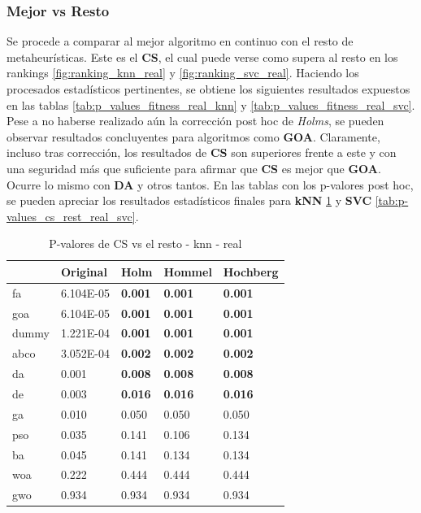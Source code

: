 \subsubsection{Mejor vs Resto}
Se procede a comparar al mejor algoritmo en continuo con el resto de metaheurísticas. Este es el \textbf{CS}, el cual puede verse como supera al resto en los rankings \ref{fig:ranking_knn_real} y \ref{fig:ranking_svc_real}. Haciendo los procesados estadísticos pertinentes, se obtiene los siguientes resultados expuestos en las tablas \ref{tab:p_values_fitness_real_knn} y \ref{tab:p_values_fitness_real_svc}.\\[6pt]
Pese a no haberse realizado aún la corrección post hoc de \textit{Holms}, se pueden observar resultados concluyentes para algoritmos como \textbf{GOA}. Claramente, incluso tras corrección, los resultados de \textbf{CS} son superiores frente a este y con una seguridad más que suficiente para afirmar que \textbf{CS} es mejor que \textbf{GOA}. Ocurre lo mismo con \textbf{DA} y otros tantos. En las tablas con los p-valores post hoc, se pueden apreciar los resultados estadísticos finales para \textbf{kNN} \ref{tab:p-values_cs_rest_real_knn} y \textbf{SVC} \ref{tab:p-values_cs_rest_real_svc}.

\begin{table}
    \centering
    \begin{tabular}{lllll}
        \toprule
        {}    & Original  & Holm           & Hommel         & Hochberg       \\
        \midrule
        fa    & 6.104E-05 & \textbf{0.001} & \textbf{0.001} & \textbf{0.001} \\
        goa   & 6.104E-05 & \textbf{0.001} & \textbf{0.001} & \textbf{0.001} \\
        dummy & 1.221E-04 & \textbf{0.001} & \textbf{0.001} & \textbf{0.001} \\
        abco  & 3.052E-04 & \textbf{0.002} & \textbf{0.002} & \textbf{0.002} \\
        da    & 0.001     & \textbf{0.008} & \textbf{0.008} & \textbf{0.008} \\
        de    & 0.003     & \textbf{0.016} & \textbf{0.016} & \textbf{0.016} \\
        ga    & 0.010     & 0.050          & 0.050          & 0.050          \\
        pso   & 0.035     & 0.141          & 0.106          & 0.134          \\
        ba    & 0.045     & 0.141          & 0.134          & 0.134          \\
        woa   & 0.222     & 0.444          & 0.444          & 0.444          \\
        gwo   & 0.934     & 0.934          & 0.934          & 0.934          \\
        \bottomrule
    \end{tabular}
    \caption{P-valores de CS vs el resto - knn - real}
    \label{tab:p-values_cs_rest_real_knn}
\end{table}


